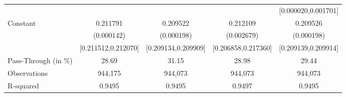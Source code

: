 {\begin{tabular}{l*{4}{c}}
                    &                     &                     &                     &[0.000020,0.001701]         \\
Constant            &    0.211791\sym{***}&    0.209522\sym{***}&    0.212109\sym{***}&    0.209526\sym{***}\\
                    &  (0.000142)         &  (0.000198)         &  (0.002679)         &  (0.000198)         \\
                    &[0.211512,0.212070]         &[0.209134,0.209909]         &[0.206858,0.217360]         &[0.209139,0.209914]         \\
\midrule
Pass-Through (in \%)&       28.69         &       31.15         &       28.98         &       29.44         \\
Observations        &     944,175         &     944,073         &     944,073         &     944,073         \\
R-squared           &      0.9495         &      0.9495         &      0.9497         &      0.9495         \\
\bottomrule
\end{tabular}
}
